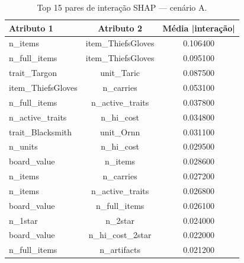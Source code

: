 \begin{table}[htbp]
\caption{Top 15 pares de interação SHAP — cenário A.}
\label{tab:intertA}
\centering
\small
\begin{tabular}{lcc}
\toprule
Atributo 1 & Atributo 2 & Média |interação| \\
\midrule
n\_items & item\_ThiefsGloves & 0.106400 \\
n\_full\_items & item\_ThiefsGloves & 0.095100 \\
trait\_Targon & unit\_Taric & 0.087500 \\
item\_ThiefsGloves & n\_carries & 0.053100 \\
n\_full\_items & n\_active\_traits & 0.037800 \\
n\_active\_traits & n\_hi\_cost & 0.034800 \\
trait\_Blacksmith & unit\_Ornn & 0.031100 \\
n\_units & n\_hi\_cost & 0.029500 \\
board\_value & n\_items & 0.028600 \\
n\_items & n\_carries & 0.027200 \\
n\_items & n\_active\_traits & 0.026800 \\
board\_value & n\_full\_items & 0.026100 \\
n\_1star & n\_2star & 0.024000 \\
board\_value & n\_hi\_cost\_2star & 0.022000 \\
n\_full\_items & n\_artifacts & 0.021200 \\
\bottomrule
\end{tabular}
\end{table}
